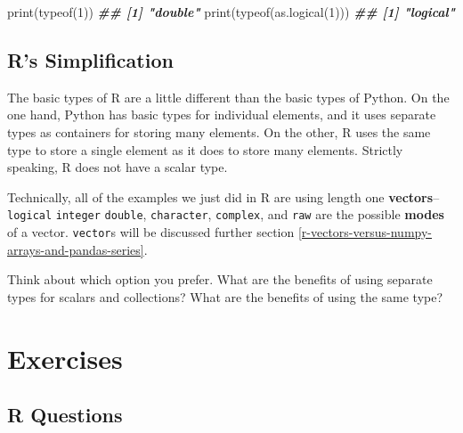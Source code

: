 \documentclass[
  12pt,
]{krantz}
\makeatletter
\newenvironment{Shaded}{\begin{snugshade}}{\end{snugshade}}
\newcommand{\DecValTok}[1]{\textcolor[rgb]{0.06,0.06,0.06}{#1}}
\newcommand{\DocumentationTok}[1]{\textcolor[rgb]{0.37,0.37,0.37}{\textbf{\textit{#1}}}}
\newcommand{\FunctionTok}[1]{\textcolor[rgb]{0,0,0}{#1}}
\newcommand{\NormalTok}[1]{#1}
\newenvironment{kframe}{%
\medskip{}
\setlength{\fboxsep}{.8em}
 \def\at@end@of@kframe{}%
 \ifinner\ifhmode%
  \def\at@end@of@kframe{\end{minipage}}%
  \begin{minipage}{\columnwidth}%
 \fi\fi%
 \def\FrameCommand##1{\hskip\@totalleftmargin \hskip-\fboxsep
 \colorbox{shadecolor}{##1}\hskip-\fboxsep
     \hskip-\linewidth \hskip-\@totalleftmargin \hskip\columnwidth}%
 \MakeFramed {\advance\hsize-\width
   \@totalleftmargin\z@ \linewidth\hsize
   \@setminipage}}%
 {\par\unskip\endMakeFramed%
 \at@end@of@kframe}
\renewenvironment{Shaded}{\begin{kframe}}{\end{kframe}}
\makeatother
\begin{document}
\begin{Shaded}
\begin{Highlighting}[]
\FunctionTok{print}\NormalTok{(}\FunctionTok{typeof}\NormalTok{(}\DecValTok{1}\NormalTok{))}
\DocumentationTok{\#\# [1] "double"}
\FunctionTok{print}\NormalTok{(}\FunctionTok{typeof}\NormalTok{(}\FunctionTok{as.logical}\NormalTok{(}\DecValTok{1}\NormalTok{)))}
\DocumentationTok{\#\# [1] "logical"}
\end{Highlighting}
\end{Shaded}

\hypertarget{rs-simplification}{%
\subsection{R's Simplification}\label{rs-simplification}}

The basic types of R are a little different than the basic types of Python. On the one hand, Python has basic types for individual elements, and it uses separate types as containers for storing many elements. On the other, R uses the same type to store a single element as it does to store many elements. Strictly speaking, R does not have a scalar type.

Technically, all of the examples we just did in R are using length one \textbf{vectors}--\texttt{logical} \texttt{integer} \texttt{double}, \texttt{character}, \texttt{complex}, and \texttt{raw} are the possible \textbf{modes} of a vector. \texttt{vector}s will be discussed further section \ref{r-vectors-versus-numpy-arrays-and-pandas-series}.

Think about which option you prefer. What are the benefits of using separate types for scalars and collections? What are the benefits of using the same type?

\hypertarget{exercises}{%
\section{Exercises}\label{exercises}}

\hypertarget{r-questions}{%
\subsection{R Questions}\label{r-questions}}
\end{document}
